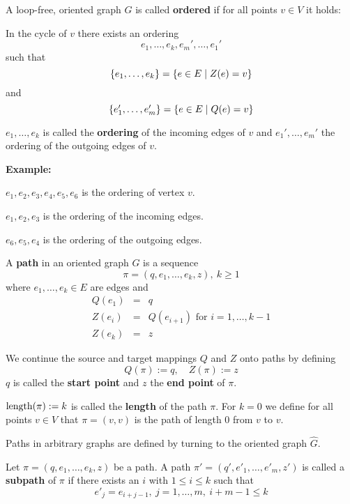 \bigskip
\begin{definition}
A loop-free, oriented graph $G$ is called {\bf ordered} if for all points
$v \in V$ it holds: 

In the cycle of $v$ there exists an ordering 
\[ e_1, \ldots, e_k, e_m', \ldots, e_1'\]
such that
\[ \mbox{$\{e_1, \ldots, e_k\}$} = \mbox{$\{e \in E \mid Z(e) = v\}$} \]
and 
\[ \mbox{$\{e_1', \ldots, e_m'\}$} = \mbox{$\{e \in E \mid Q(e) = v\}$} \]
\end{definition}

$e_1, \ldots, e_k$ is called the {\bf ordering} of the incoming edges of $v$ and
$e_1', \ldots, e_m'$ the ordering of the outgoing edges of $v$.

\medskip
{\bf Example:}

\begin{center}

\end{center}

$e_1, e_2, e_3, e_4, e_5, e_6$ is the ordering of vertex $v$.

$e_1, e_2, e_3$ is the ordering of the incoming edges.

$e_6, e_5, e_4$ is the ordering of the outgoing edges.

\bigskip
\begin{definition}
A {\bf path} in an oriented graph $G$ is a sequence 
\[ \pi = (q, e_1, \ldots, e_k, z),\ k \geq 1 \]
where $ e_1, \ldots, e_k \in E$ are edges and
\begin{eqnarray*}
Q(e_1) & = & q \\
Z(e_{i}) & = & Q(e_{i+1})\text{ for }i = 1, \ldots, k-1 \\
Z(e_k) & = & z 
\end{eqnarray*}
\end{definition}

We continue the source and target mappings $Q$ and $Z$ onto paths by defining
\[ Q(\pi) := q,\quad Z(\pi) := z \]
$q$ is called the {\bf start point} and $z$ the {\bf end point} of $\pi$.

$\mathrm{length}({\pi}) := k$ is called the {\bf length} of the path $\pi$. For $k = 0$ we
define for all points $v \in V$ that $\pi = (v, v)$ is the path of length 0 from
$v$ to $v$.

Paths in arbitrary graphs are defined by turning to the oriented graph
$\hat{G}$.

\bigskip
\begin{definition}
Let $\pi = (q, e_1, \ldots, e_k, z)$ be a path. A path $\pi' = (q', e'_1,
\ldots, e'_m, z')$ is called a {\bf subpath} of $\pi$ if there exists an $i$
with $1 \leq i \leq k$ such that
\[ e'_j = e_{i+j-1},\ j = 1, \ldots, m,\ i + m - 1 \leq k \]
\end{definition}

